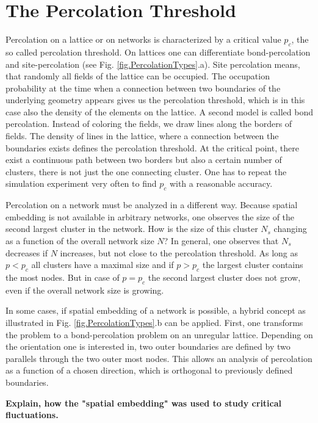 \documentclass[a4paper,10pt]{scrbook}
\begin{document}
\section{The Percolation Threshold}
Percolation on a lattice or on networks is characterized by a critical value $p_c$, the so called percolation threshold. On lattices one can differentiate bond-percolation and site-percolation (see Fig. \ref{fig.PercolationTypes}.a). Site percolation means, that randomly all fields of the lattice can be occupied. The occupation probability at the time when a connection between two boundaries of the underlying geometry appears gives us the percolation threshold, which is in this case also the density of the elements on the lattice. A second model is called bond percolation. Instead of coloring the fields, we draw lines along the borders of fields. The density of lines in the lattice, where a connection between the boundaries exists defines the percolation threshold. At the critical point, there exist a continuous path between two borders but also a certain number of clusters, there is not just the one connecting cluster. One has to repeat the simulation experiment very often to find $p_c$ with a reasonable accuracy.


Percolation on a network must be analyzed in a different way. Because spatial embedding is not available in arbitrary networks, one observes the size of the second largest cluster in the network. How is the size of this cluster $N_s$ changing as a function of the overall network size $N$? In general, one observes that $N_s$ decreases if $N$ increases, but not close to the percolation threshold. As long as $p < p_c$ all clusters have a maximal size and if $p > p_c$ the largest cluster contains the most nodes. But in case of $p = p_c$ the second largest cluster does not grow, even if the overall network size is growing.
 
In some cases, if spatial embedding of a network is possible, a hybrid concept as illustrated in Fig. \ref{fig.PercolationTypes}.b can be applied. First, one transforms the problem to a bond-percolation problem on an unregular lattice. Depending on the orientation one is interested in, two outer boundaries are defined by two parallels through the two outer most nodes. This allows an analysis of percolation as a function of a chosen direction, which is orthogonal to previously defined boundaries.

\label{ext.fig.PercolationTypes} 


\cite{Bradde2010}
\textbf{Explain, how the "spatial embedding" was used to study critical fluctuations.}
\end{document}
